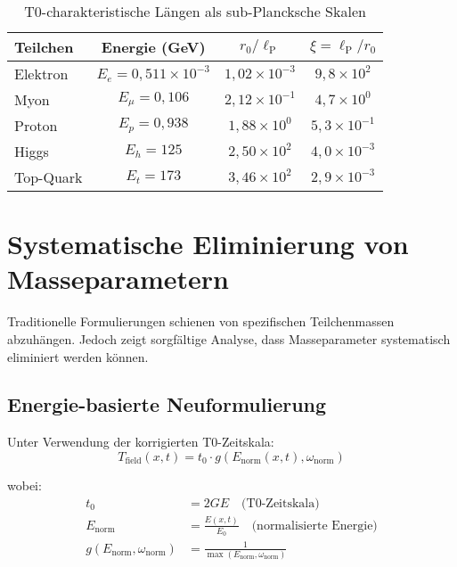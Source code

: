 \documentclass[12pt,a4paper]{report}
\newcommand{\lP}{\ell_{\text{P}}}         %
\newcommand{\rzero}{r_0}                  %
\newcommand{\tzero}{t_0}                  %
\begin{document}
	\begin{table}[htbp]
		\centering
		\begin{tabular}{lccc}
			\toprule
			\textbf{Teilchen} & \textbf{Energie (GeV)} & \textbf{$\rzero/\lP$} & \textbf{$\xi = \lP/\rzero$} \\
			\midrule
			Elektron & $E_e = 0,511 \times 10^{-3}$ & $1,02 \times 10^{-3}$ & $9,8 \times 10^{2}$ \\
			Myon & $E_\mu = 0,106$ & $2,12 \times 10^{-1}$ & $4,7 \times 10^{0}$ \\
			Proton & $E_p = 0,938$ & $1,88 \times 10^{0}$ & $5,3 \times 10^{-1}$ \\
			Higgs & $E_h = 125$ & $2,50 \times 10^{2}$ & $4,0 \times 10^{-3}$ \\
			Top-Quark & $E_t = 173$ & $3,46 \times 10^{2}$ & $2,9 \times 10^{-3}$ \\
			\bottomrule
		\end{tabular}
		\caption{T0-charakteristische Längen als sub-Plancksche Skalen}
		\label{tab:sub_planckian_scales}
	\end{table}
	
	\section{Systematische Eliminierung von Masseparametern}
	\label{sec:mass_elimination}
	
	Traditionelle Formulierungen schienen von spezifischen Teilchenmassen abzuhängen. Jedoch zeigt sorgfältige Analyse, dass Masseparameter systematisch eliminiert werden können.
	
	\subsection{Energie-basierte Neuformulierung}
	\label{subsec:energy_based_reformulation}
	
	Unter Verwendung der korrigierten T0-Zeitskala:
	\begin{equation}
		\boxed{T_{\text{field}}(x,t) = \tzero \cdot g(E_{\text{norm}}(x,t), \omega_{\text{norm}})}
		\label{eq:time_field_energy_based}
	\end{equation}
	
	wobei:
	\begin{align}
		\tzero &= 2GE \quad \text{(T0-Zeitskala)} \\
		E_{\text{norm}} &= \frac{E(x,t)}{E_0} \quad \text{(normalisierte Energie)} \\
		g(E_{\text{norm}}, \omega_{\text{norm}}) &= \frac{1}{\max(E_{\text{norm}}, \omega_{\text{norm}})}
	\end{align}
	
\end{document}

